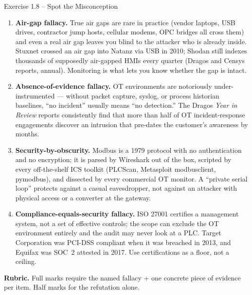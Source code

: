 \documentclass[11pt,a4paper]{article}
\begin{document}
\begin{solutionbox}{Exercise 1.8 -- Spot the Misconception}
\begin{enumerate}
  \item \textbf{Air-gap fallacy.} True air gaps are rare in practice (vendor laptops, USB drives, contractor jump hosts, cellular modems, OPC bridges all cross them) and even a real air gap leaves you blind to the attacker who is already inside. Stuxnet crossed an air gap into Natanz via USB in 2010; Shodan still indexes thousands of supposedly air-gapped HMIs every quarter (Dragos and Censys reports, annual). Monitoring is what lets you know whether the gap is intact.
  \item \textbf{Absence-of-evidence fallacy.} OT environments are notoriously under-instrumented --- without packet capture, syslog, or process historian baselines, ``no incident'' usually means ``no detection.'' The Dragos \emph{Year in Review} reports consistently find that more than half of OT incident-response engagements discover an intrusion that pre-dates the customer's awareness by months.
  \item \textbf{Security-by-obscurity.} Modbus is a 1979 protocol with no authentication and no encryption; it is parsed by Wireshark out of the box, scripted by every off-the-shelf ICS toolkit (PLCScan, Metasploit modbusclient, pymodbus), and dissected by every commercial OT monitor. A ``private serial loop'' protects against a casual eavesdropper, not against an attacker with physical access or a converter at the gateway.
  \item \textbf{Compliance-equals-security fallacy.} ISO 27001 certifies a management system, not a set of effective controls; the scope can exclude the OT environment entirely and the audit may never look at a PLC. Target Corporation was PCI-DSS compliant when it was breached in 2013, and Equifax was SOC~2 attested in 2017. Use certifications as a floor, not a ceiling.
\end{enumerate}

\textbf{Rubric.} Full marks require the named fallacy + one concrete piece of evidence per item. Half marks for the refutation alone.
\end{solutionbox}
\end{document}

